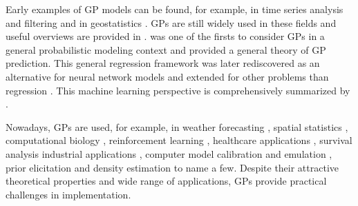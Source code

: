 \documentclass[twoside,11pt]{article}
\newcommand{\pkg}[1]{{\fontseries{b}\selectfont #1}}
\newcommand{\code}[1]{{\normalfont\texttt{#1}}}
\begin{document}

Early examples of GP models can be found, for example, in time series
analysis and filtering \citep{Wiener:1949} and in geostatistics
\citep[e.g.][]{Matheron:1973}.  GPs are still widely used in these
fields and useful overviews are provided in
\citep{Cressie:1993,Grewal+Andrews:2001,Diggle+Ribeiro:2007,Gelfand+Diggle+Fuentes+Guttorp:2010}.
\citet{OHagan:1978} was one of the firsts to consider GPs in a general
probabilistic modeling context and provided a general theory of GP
prediction. This general regression framework was later rediscovered
as an alternative for neural network models
\citep{Williams+Rasmussen:1996,Rasmussen:1996} and extended for other
problems than regression \citep{Neal:1997,Williams+Barber:1998}. This
machine learning perspective is comprehensively summarized by
\citet{Rasmussen+Williams:2006}.

Nowadays, GPs are used, for example, in weather forecasting
\citep{Fuentes+Raftery:2005,Berrocal+Raftery+Gneiting+Steed:2009},
spatial statistics
\citep{Best+Richardson+Thomson:2005,Kaufman+Schervish+Nychka:2008,Banerjee+Gelfand+Finley+Sang:2008,Myllymaki+Sarkka+Vehtari:2014},
computational biology
\citep{Honkela+Gao+Ropponen+Rattray+Lawrence:2011}, reinforcement
learning
\citep{Deisenroth+Rasmussen+Peters:2009,Deisenroth+Rasmussen+Fox:2011},
healthcare applications
\citep{Stegle+Fallert+MacKay+Brage:2008,Vanhatalo+Pietilainen+Vehtari:2010,Rantonen+Vehtari+etal:2012,Rantonen+Vehtari+etal:2014},
survival analysis \citep{Joensuu+etal:2012a,Joensuu+Reichardt+Eriksson+Hall+Vehtari:2014}
industrial applications \citep{Kalliomaki+Vehtari+Lampinen:2005},
computer model calibration and emulation
\citep{Kennedy+OHagan:2001,Conti+Gosling+Oakley+OHagan:2009}, prior
elicitation \citep{Moala+OHagan:2010} and density estimation
\citep{Tokdar+Ghosh:2007,Tokdar+Zhu+Ghosh:2010,Riihimaki+Vehtari:2014} to name a few.
Despite their attractive theoretical properties and wide range of
applications, GPs provide practical challenges in implementation.
\end{document}
